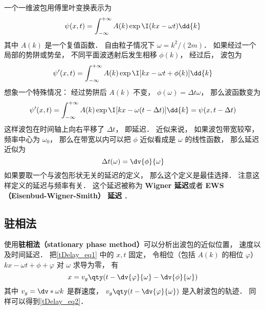 
\begin{issues}
\issueDraft
\end{issues}

一个一维波包用傅里叶变换表示为
\begin{equation}
\psi(x, t) = \int_{-\infty}^{+\infty} A(k) \exp \I( kx - \omega t) \dd{k}
\end{equation}
其中 $A(k)$ 是一个复值函数． 自由粒子情况下 $\omega = k^2/(2m)$． 如果经过一个局部的势阱或势垒， 不同平面波透射后发生相移 $\phi(k)$， 经过后， 波包为
\begin{equation}\label{tDelay_eq1}
\psi'(x, t) = \int_{-\infty}^{+\infty} A(k) \exp \I[kx - \omega t + \phi(k)] \dd{k}
\end{equation}
想象一个特殊情况： 经过势阱后 $A(k)$ 不变， $\phi(\omega) = \Delta t \omega$， 那么波函数变为
\begin{equation}
\psi'(x, t) = \int_{-\infty}^{+\infty} A(k) \exp \I[kx - \omega (t - \Delta t) ] \dd{k}
= \psi(x, t - \Delta t)
\end{equation}
这样波包在时间轴上向右平移了 $\Delta t$， 即延迟． 近似来说， 如果波包带宽较窄， 频率中心为 $\omega_0$， 那么在带宽以内可以把 $\phi$ 近似看成是 $\omega$ 的线性函数， 那么延迟近似为
\begin{equation}\label{tDelay_eq2}
\Delta t(\omega) = \dv{\phi}{\omega}
\end{equation}
如果要取一个与波包形状无关的延迟的定义， 那么这个定义是最佳选择． 注意这样定义的延迟与频率有关． 这个延迟被称为 \textbf{Wigner 延迟}或者 \textbf{EWS （Eisenbud-Wigner-Smith） 延迟} ．

\subsection{驻相法}
使用\textbf{驻相法（stationary phase method）}可以分析出波包的近似位置， 速度以及时间延迟． 把\autoref{tDelay_eq1} 中的 $x, t$ 固定， 令相位（包括 $A(k)$ 的相位 $\varphi$） $kx - \omega t + \phi + \varphi$ 对 $\omega$ 求导为零， 有
\begin{equation}
x = v_g \qty(t - \dv{\varphi}{\omega} - \dv{\phi}{\omega})
\end{equation}
其中 $v_g = \dv*{\omega}{k}$ 是群速度， $v_g \qty(t - \dv{\varphi}{\omega})$ 是入射波包的轨迹． 同样可以得到\autoref{tDelay_eq2}．
